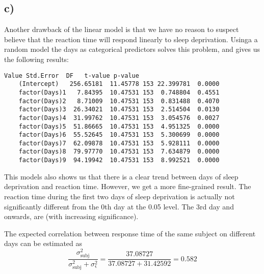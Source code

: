 \documentclass[a4paper, twocolumn]{article}
\begin{document}
\subsection*{c)}
Another drawback of the linear model is that we have no reason to suspect believe that the reaction time will respond linearly to sleep deprivation. Usinga a random model the days as categorical predictors solves this problem, and gives us the following results:
\begin{Verbatim}[fontsize=\scriptsize]
                    Value Std.Error  DF   t-value p-value
    (Intercept)   256.65181  11.45778 153 22.399781  0.0000
    factor(Days)1   7.84395  10.47531 153  0.748804  0.4551
    factor(Days)2   8.71009  10.47531 153  0.831488  0.4070
    factor(Days)3  26.34021  10.47531 153  2.514504  0.0130
    factor(Days)4  31.99762  10.47531 153  3.054576  0.0027
    factor(Days)5  51.86665  10.47531 153  4.951325  0.0000
    factor(Days)6  55.52645  10.47531 153  5.300699  0.0000
    factor(Days)7  62.09878  10.47531 153  5.928111  0.0000
    factor(Days)8  79.97770  10.47531 153  7.634879  0.0000
    factor(Days)9  94.19942  10.47531 153  8.992521  0.0000
\end{Verbatim}

This models also shows us that there is a clear trend between days of sleep deprivation and reaction time. However, we get a more fine-grained result. The reaction time during the first two days of sleep deprivation is actually not significantly different from the 0th day at the 0.05 level. The 3rd day and onwards, are (with increasing significance).

The expected correlation between response time of the same subject on different days can be estimated as
\begin{equation}
    \frac{\sigma_\mathrm{subj}^2}{\sigma_\mathrm{subj}^2 + \sigma_\mathrm{\epsilon}^2} = \frac{37.08727}{37.08727 + 31.42592} = 0.582
\end{equation}
\end{document}
